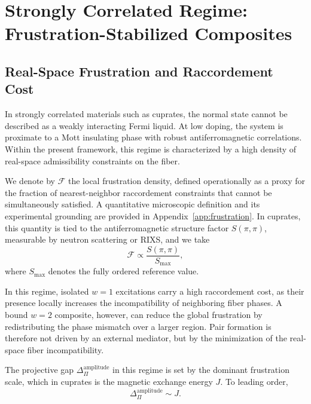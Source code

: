\section{Strongly Correlated Regime: Frustration-Stabilized Composites}
  \label{sec:strongly-correlated-regime}

  \subsection{Real-Space Frustration and Raccordement Cost}
    \label{subsec:frustration-raccordement}

    In strongly correlated materials such as cuprates,
    the normal state cannot be described as a weakly interacting Fermi liquid.
    At low doping, the system is proximate to a Mott insulating phase
    with robust antiferromagnetic correlations.
    Within the present framework,
    this regime is characterized by a high density of
    real-space admissibility constraints on the fiber.

    We denote by $\mathcal{F}$ the local frustration density,
    defined operationally as a proxy for the fraction of
    nearest-neighbor raccordement constraints
    that cannot be simultaneously satisfied.
    A quantitative microscopic definition and its experimental grounding
    are provided in Appendix~\ref{app:frustration}.
    In cuprates, this quantity is tied to the
    antiferromagnetic structure factor $S(\pi,\pi)$,
    measurable by neutron scattering or RIXS,
    and we take
    \begin{equation}
      \mathcal{F}
      \propto
      \frac{S(\pi,\pi)}{S_{\max}},
      \label{eq:frustration-proxy}
    \end{equation}
    where $S_{\max}$ denotes the fully ordered reference value.

    In this regime,
    isolated $w=1$ excitations carry a high raccordement cost,
    as their presence locally increases
    the incompatibility of neighboring fiber phases.
    A bound $w=2$ composite,
    however,
    can reduce the global frustration
    by redistributing the phase mismatch
    over a larger region.
    Pair formation is therefore not driven by an external mediator,
    but by the minimization of the real-space fiber incompatibility.

    The projective gap $\Delta_\Pi^{\mathrm{amplitude}}$
    in this regime is set by the dominant frustration scale,
    which in cuprates is the magnetic exchange energy $J$.
    To leading order,
    \begin{equation}
      \Delta_\Pi^{\mathrm{amplitude}}
      \sim
      J .
      \label{eq:gap-frustration}
    \end{equation}

